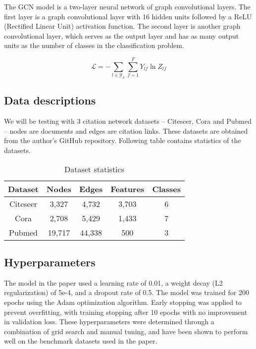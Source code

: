 \documentclass[11pt,a4paper]{article}
\begin{document}
The GCN model is a two-layer neural network of graph convolutional layers. The first layer is a graph convolutional layer with 16 hidden units followed by a ReLU (Rectified Linear Unit) activation function. The second layer is another graph convolutional layer, which serves as the output layer and has as many output units as the number of classes in the classification problem.

\begin{equation}
  \mathcal{L} = -\sum_{l\in \mathcal{Y}_L}\sum_{f=1}^{F} Y_{lf}\ln Z_{lf}
\end{equation}

\subsection{Data descriptions}

We will be testing with 3 citation network datasets -- Citeseer, Cora and Pubmed -- nodes are documents and edges are citation links. These datasets are obtained from the author's GitHub repository. Following table contains statistics of the datasets.

\begin{table}[h]
\centering
\begin{tabular}{|c|c|c|c|c|}
\hline
Dataset & Nodes & Edges & Features & Classes \\ \hline
Citeseer & 3,327 & 4,732 & 3,703 & 6 \\ \hline
Cora & 2,708 & 5,429 & 1,433 & 7 \\ \hline
Pubmed & 19,717 & 44,338 & 500 & 3 \\ \hline
\end{tabular}
\caption{Dataset statistics}
\end{table}

\subsection{Hyperparameters}

The model in the paper used a learning rate of 0.01, a weight decay (L2 regularization) of 5e-4, and a dropout rate of 0.5. The model was trained for 200 epochs using the Adam optimization algorithm. Early stopping was applied to prevent overfitting, with training stopping after 10 epochs with no improvement in validation loss. These hyperparameters were determined through a combination of grid search and manual tuning, and have been shown to perform well on the benchmark datasets used in the paper.
\end{document}
